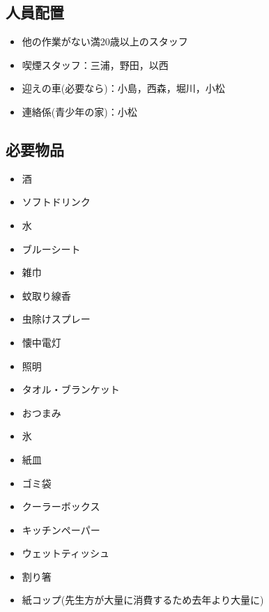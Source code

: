 \subsection{人員配置}
\begin{itemize}
\item 他の作業がない満20歳以上のスタッフ
\item 喫煙スタッフ：三浦，野田，以西
\item 迎えの車(必要なら)：小島，西森，堀川，小松
\item 連絡係(青少年の家)：小松
\end{itemize}


\subsection{必要物品}
\begin{itemize}
  \item 酒
  \item ソフトドリンク
  \item 水
  \item ブルーシート
  \item 雑巾
  \item 蚊取り線香
  \item 虫除けスプレー
  \item 懐中電灯
  \item 照明
  \item タオル・ブランケット
  \item おつまみ
  \item 氷
  \item 紙皿
  \item ゴミ袋
  \item クーラーボックス
  \item キッチンペーパー
  \item ウェットティッシュ
  \item 割り箸
  \item 紙コップ(先生方が大量に消費するため去年より大量に)
\end{itemize}


